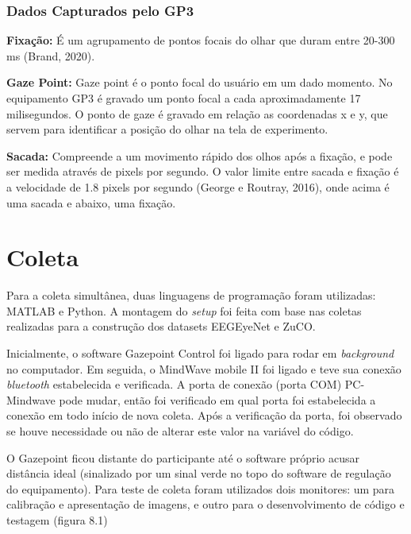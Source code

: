 \subsubsection{Dados Capturados pelo GP3}

\textbf{Fixação:} É um agrupamento de pontos focais do olhar que duram entre 20-300 ms (Brand, 2020).

\textbf{Gaze Point:} Gaze point é o ponto focal do usuário em um dado momento. No equipamento GP3 é gravado um ponto focal a cada aproximadamente 17 milisegundos.
O ponto de gaze é gravado em relação as coordenadas x e y, que servem para identificar a posição do olhar na tela de experimento. 

\textbf{Sacada:} Compreende a um movimento rápido dos olhos após a fixação, e pode ser medida através de pixels por segundo.
O valor limite entre sacada e fixação é a velocidade de 1.8 pixels por segundo (George e Routray, 2016), onde acima
é uma sacada e abaixo, uma fixação.




\section{Coleta}
Para a coleta simultânea, duas linguagens de programação foram utilizadas: MATLAB e Python. 
A montagem do \textit{setup} foi feita com base nas coletas realizadas para a construção dos datasets EEGEyeNet e 
 ZuCO. 

Inicialmente, o software Gazepoint Control foi ligado para rodar em \textit{background} no computador. 
Em seguida, o MindWave mobile II foi ligado e teve sua conexão \textit{bluetooth} estabelecida e verificada.
A porta de conexão (porta COM) PC-Mindwave pode mudar, então foi verificado em qual porta foi estabelecida a conexão 
em todo início de nova coleta. Após a verificação da porta, foi observado se houve necessidade ou não de alterar
este valor na variável do código. 
    
 
 
 O Gazepoint
  ficou distante do participante até o software próprio acusar distância ideal
   (sinalizado por um sinal verde no topo do software de regulação do equipamento). 
   Para teste de coleta foram utilizados dois monitores: um para calibração e apresentação de imagens, 
   e outro para o desenvolvimento de código e testagem (figura 8.1) 


